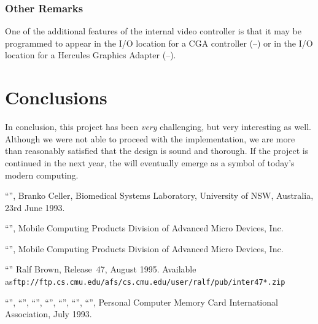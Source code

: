 \documentclass[final]{unswthesis}
\begin{document}
\subsection{Other Remarks}

One of the additional features of the internal video controller is that
it may be programmed to appear in the I/O location for a CGA controller
(--) or in the I/O location for a Hercules Graphics
Adapter (--).

\chapter{Conclusions}\label{ch:concl}

In conclusion, this project has been \emph{very} challenging, but very
interesting as well.  Although we were not able to proceed with the
implementation, we are more than reasonably satisfied that the design is
sound and thorough.  If the project is continued in the next year, the
\EPC will eventually emerge as a symbol of today's modern computing.


\begin{thebibliography}{199}
\ssp


``'',
Branko Celler, Biomedical Systems Laboratory, University of NSW,
Australia, 23rd June 1993.


``'',
Mobile Computing Products Division of Advanced Micro Devices, Inc.


``'',
Mobile Computing Products Division of Advanced Micro Devices, Inc.


``''
Ralf Brown, Release~47, August 1995.
Available as\linebreak\texttt{ftp://ftp.cs.cmu.edu/afs/cs.cmu.edu/user/ralf/pub/inter47*.zip}



``'',
``'',
``'',
``'',
``'',
``'',
``'',
Personal Computer Memory Card International Association,
July 1993.

\end{thebibliography}
\end{document}
